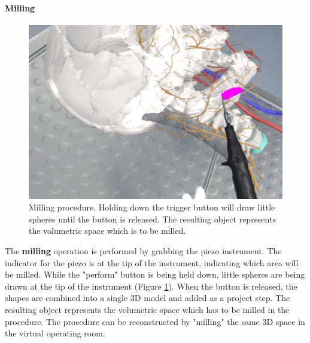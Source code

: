 \paragraph{Milling}

\begin{figure}[ht]
    \centering
    \includegraphics[width=\linewidth]{images/implementation/features/procedures/piezo.png}
    \caption{\label{fig::FeaturePiezo}Milling procedure. Holding down the trigger button will draw little spheres until the button is released. The resulting object represents the volumetric space which is to be milled.}
\end{figure}

The \textbf{milling} operation is performed by grabbing the piezo instrument.
The indicator for the piezo is at the tip of the instrument, indicating which area will be milled.
While the "perform" button is being held down, little spheres are being drawn at the tip of the instrument (Figure \ref{fig::FeaturePiezo}).
When the button is released, the shapes are combined into a single 3D model and added as a project step.
The resulting object represents the volumetric space which has to be milled in the procedure.
The procedure can be reconstructed by "milling" the same 3D space in the virtual operating room.